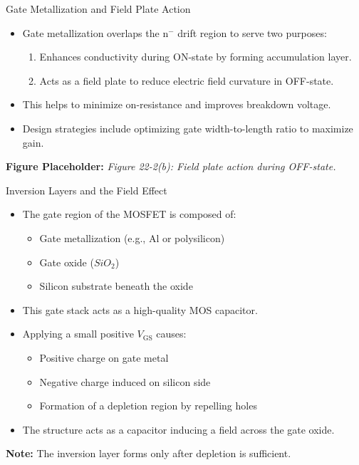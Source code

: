 \begin{frame}{Gate Metallization and Field Plate Action}
\begin{itemize}
    \item Gate metallization overlaps the n$^-$ drift region to serve two purposes:
    \begin{enumerate}
        \item Enhances conductivity during ON-state by forming accumulation layer.
        \item Acts as a field plate to reduce electric field curvature in OFF-state.
    \end{enumerate}
    \item This helps to minimize on-resistance and improves breakdown voltage.
    \item Design strategies include optimizing gate width-to-length ratio to maximize gain.
\end{itemize}

\vspace{0.5cm}
\textbf{Figure Placeholder:} \textit{Figure 22-2(b): Field plate action during OFF-state.}
\end{frame}


\begin{frame}{Inversion Layers and the Field Effect}
\begin{itemize}
    \item The gate region of the MOSFET is composed of:
    \begin{itemize}
        \item Gate metallization (e.g., Al or polysilicon)
        \item Gate oxide ($SiO_2$)
        \item Silicon substrate beneath the oxide
    \end{itemize}
    \item This gate stack acts as a high-quality MOS capacitor.
    \item Applying a small positive $V_{\mathrm{GS}}$ causes:
    \begin{itemize}
        \item Positive charge on gate metal
        \item Negative charge induced on silicon side
        \item Formation of a depletion region by repelling holes
    \end{itemize}
    \item The structure acts as a capacitor inducing a field across the gate oxide.
\end{itemize}
\vspace{0.5em}
\textbf{Note:} The inversion layer forms only after depletion is sufficient.
\end{frame}


